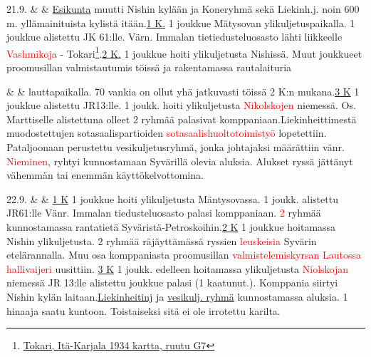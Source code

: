 \documentclass[11pt,a5paper,oneside]{book}
\begin{document}
21.9. & & \underline{Esikunta} muutti Nishin kylään ja Koneryhmä sekä Liekinh.j. noin 600 m. yllämainituista kylistä itään.\newline\newline \underline{1 K.} 1 joukkue Mätysovan ylikuljetuspaikalla. 1 joukkue alistettu JK 61:lle. Värn. Immalan tietiedusteluosasto lähti liikkeelle \textcolor{red}{Vashmikoja} - Tokari\footnote{\href{https://www.google.com/maps/place/Tokari,+Leningradin+alue,+Ven\%C3\%A4j\%C3\%A4,+187790/@61.0959479,34.3856997,3034m/}{Tokari, Itä-Karjala 1934 kartta, ruutu G7}}.\newline\newline \underline{2 K.} 1 joukkue hoiti ylikuljetusta Nishissä. Muut joukkueet proomusillan valmistautumis töissä ja rakentamassa rautalaituria \\

\taulustop


& & lauttapaikalla. 70 vankia on ollut yhä jatkuvasti töissä 2 K:n mukana.\newline\newline \underline{3 K} 1 joukkue alistettu JR13:lle. 1 joukk. hoiti ylikuljetusta \textcolor{red}{Nikolskojen} niemessä. Os. Marttiselle alistettuna olleet 2 ryhmää palasivat komppaniaan.\newline\newline Liekinheittimestä muodostettujen sotasaalispartioiden \textcolor{red}{sotasaalishuoltotoimistyö} lopetettiin. Pataljoonaan perustettu vesikuljetusryhmä, jonka johtajaksi määrättiin vänr. \textcolor{red}{Nieminen}, ryhtyi kunnostamaan Syvärillä olevia aluksia. Alukset ryssä jättänyt vähemmän tai enemmän käyttökelvottomina. \\

\newpage

22.9. & & \underline{1 K} 1 joukkue hoiti ylikuljetusta Mäntysovassa. 1 joukk. alistettu JR61:lle Vänr. Immalan tiedusteluosasto palasi komppaniaan. \textcolor{red}{2} ryhmää kunnostamassa rantatietä Syväristä-Petroskoihin.\newline\newline \underline{2 K} 1 joukkue hoitamassa Nishin ylikuljetusta. 2 ryhmää räjäyttämässä ryssien \textcolor{red}{leuskeisia} Syvärin etelärannalla. Muu osa komppaniasta proomusillan \textcolor{red}{valmistelemiskyrsan} \textcolor{red}{Lautossa} \textcolor{red}{hallivaijeri} uusittiin. \newline\newline \underline{3 K} 1 joukk. edelleen hoitamassa ylikuljetusta \textcolor{red}{Niolskojan} niemessä JR 13:lle alistettu joukkue palasi (1 kaatunut.). Komppania siirtyi Nishin kylän laitaan.\newline\newline \underline{Liekinheitinj} ja \underline{vesikulj. ryhmä} kunnostamassa aluksia. 1 hinaaja saatu kuntoon. Toistaiseksi sitä ei ole irrotettu karilta. \\
\end{document}
